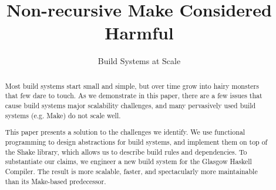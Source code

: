 \documentclass{sigplanconf}
\begin{document}
\setlength{\pdfpageheight}{\paperheight}
\setlength{\pdfpagewidth}{\paperwidth}


\title{Non-recursive Make Considered Harmful}
\subtitle{Build Systems at Scale}


\maketitle
\begin{abstract}
Most build systems start small and simple, but over time grow into hairy monsters
that few dare to touch. As we demonstrate in this paper, there are a few issues
that cause build systems major scalability challenges, and many pervasively
used build systems (e.g. Make) do not scale well.

This paper presents a solution to the challenges we identify. We use functional
programming to design abstractions for build systems, and implement
them on top of the Shake library, which allows us to describe build rules and
dependencies. To substantiate our claims, we engineer a new build system
for the Glasgow Haskell Compiler. The result is more scalable, faster, and
spectacularly more maintainable than its Make-based predecessor.
\end{abstract}













\balance

\end{document}
